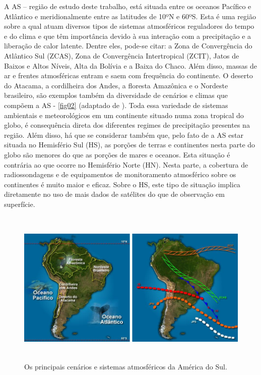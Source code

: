 A AS – região de estudo deste trabalho, está situada entre os oceanos Pacífico e Atlântico e meridionalmente entre as latitudes de 10ºN e 60ºS. Esta é uma região sobre a qual atuam diversos tipos de sistemas atmosféricos reguladores do tempo e do clima e que têm importância devido à sua interação com a precipitação e a liberação de calor latente. Dentre eles, pode-se citar: a Zona de Convergência do Atlântico Sul (ZCAS), Zona de Convergência Intertropical (ZCIT), Jatos de Baixos e Altos Níveis, Alta da Bolívia e a Baixa do Chaco. Além disso, massas de ar e frentes atmosféricas entram e saem com frequência do continente. O deserto do Atacama, a cordilheira dos Andes, a floresta Amazônica e o Nordeste brasileiro, são exemplos também da diversidade de cenários e climas que compõem a AS - \autoref{fig02} (adaptado de ). Toda essa variedade de sistemas ambientais e meteorológicos em um continente situado numa zona tropical do globo, é consequência direta dos diferentes regimes de precipitação presentes na região. Além disso, há que se considerar também que, pelo fato de a AS estar situada no Hemisfério Sul (HS), as porções de terras e continentes nesta parte do globo são menores do que as porções de mares e oceanos. Esta situação é contrária ao que ocorre no Hemisfério Norte (HN). Nesta parte, a cobertura de radiossondagens e de equipamentos de monitoramento atmosférico sobre os continentes é muito maior e eficaz. Sobre o HS, este tipo de situação implica diretamente no uso de mais dados de satélites do que de observação em superfície.

\begin{figure}
\centering
\includegraphics[height=7.5cm]{./figs/fig02.png}
\caption{Os principais cenários e sistemas atmosféricos da América do Sul.}
\label{fig02}
\end{figure}

